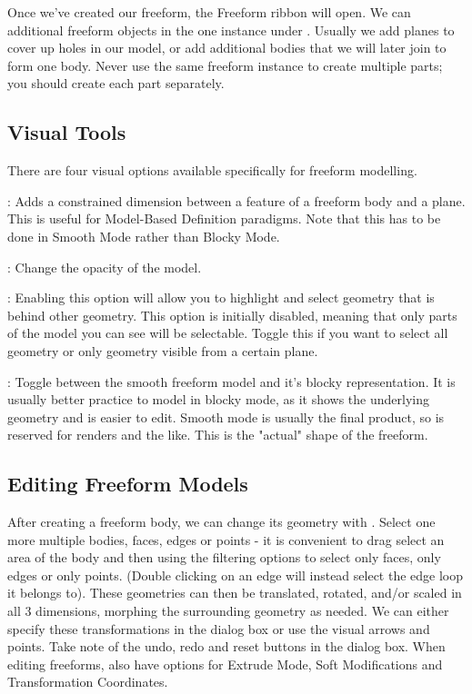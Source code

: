 Once we've created our freeform, the Freeform ribbon will open. We can additional freeform objects in the one instance under . Usually we add planes to cover up holes in our model, or add additional bodies that we will later join to form one body. Never use the same freeform instance to create multiple parts; you should create each part separately.

\subsection{Visual Tools}

There are four visual options available specifically for freeform modelling.

: \newline
Adds a constrained dimension between a feature of a freeform body and a plane. This is useful for Model-Based Definition paradigms. Note that this has to be done in Smooth Mode rather than Blocky Mode.

: \newline
Change the opacity of the model. 

: \newline
Enabling this option will allow you to highlight and select geometry that is behind other geometry. This option is initially disabled, meaning that only parts of the model you can see will be selectable. Toggle this if you want to select all geometry or only geometry visible from a certain plane.

: \newline
Toggle between the smooth freeform model and it's blocky representation. It is usually better practice to model in blocky mode, as it shows the underlying geometry and is easier to edit. Smooth mode is usually the final product, so is reserved for renders and the like. This is the "actual" shape of the freeform.


\subsection{Editing Freeform Models}

After creating a freeform body, we can change its geometry with . Select one more multiple bodies, faces, edges or points - it is convenient to drag select an area of the body and then using the filtering options to select only faces, only edges or only points. (Double clicking on an edge will instead select the edge loop it belongs to). These geometries can then be translated, rotated, and/or scaled in all 3 dimensions, morphing the surrounding geometry as needed. We can either specify these transformations in the dialog box or use the visual arrows and points. Take note of the undo, redo and reset buttons in the dialog box. When editing freeforms, also have options for Extrude Mode, Soft Modifications and Transformation Coordinates.

